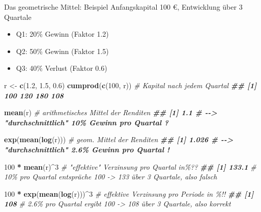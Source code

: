 \documentclass[
  10pt,
  ignorenonframetext,
]{beamer}
\newenvironment{Shaded}{\begin{snugshade}}{\end{snugshade}}
\newcommand{\CommentTok}[1]{\textcolor[rgb]{0.56,0.35,0.01}{\textit{#1}}}
\newcommand{\DecValTok}[1]{\textcolor[rgb]{0.00,0.00,0.81}{#1}}
\newcommand{\DocumentationTok}[1]{\textcolor[rgb]{0.56,0.35,0.01}{\textbf{\textit{#1}}}}
\newcommand{\FloatTok}[1]{\textcolor[rgb]{0.00,0.00,0.81}{#1}}
\newcommand{\FunctionTok}[1]{\textcolor[rgb]{0.13,0.29,0.53}{\textbf{#1}}}
\newcommand{\NormalTok}[1]{#1}
\newcommand{\OtherTok}[1]{\textcolor[rgb]{0.56,0.35,0.01}{#1}}
\newcommand{\SpecialCharTok}[1]{\textcolor[rgb]{0.81,0.36,0.00}{\textbf{#1}}}
\providecommand{\tightlist}{%
  \setlength{\itemsep}{0pt}\setlength{\parskip}{0pt}}
\begin{document}
\begin{frame}[fragile]{Das geometrische Mittel: Beispiel}
\protect\hypertarget{das-geometrische-mittel-beispiel}{}
Anfangskapital 100 €, Entwicklung über 3 Quartale

\begin{itemize}
\tightlist
\item
  Q1: 20\% Gewinn (Faktor 1.2)
\item
  Q2: 50\% Gewinn (Faktor 1.5)
\item
  Q3: 40\% Verlust (Faktor 0.6)\\
\end{itemize}

\scriptsize

\begin{Shaded}
\begin{Highlighting}[]
\NormalTok{r }\OtherTok{\textless{}{-}} \FunctionTok{c}\NormalTok{(}\FloatTok{1.2}\NormalTok{, }\FloatTok{1.5}\NormalTok{, }\FloatTok{0.6}\NormalTok{)}
\FunctionTok{cumprod}\NormalTok{(}\FunctionTok{c}\NormalTok{(}\DecValTok{100}\NormalTok{, r)) }\CommentTok{\# Kapital nach jedem Quartal}
\DocumentationTok{\#\# [1] 100 120 180 108}

\FunctionTok{mean}\NormalTok{(r) }\CommentTok{\# arithmetisches Mittel der Renditen}
\DocumentationTok{\#\# [1] 1.1 \# {-}{-}\textgreater{} "durchschnittlich" 10\% Gewinn pro Quartal ?}

\FunctionTok{exp}\NormalTok{(}\FunctionTok{mean}\NormalTok{(}\FunctionTok{log}\NormalTok{(r))) }\CommentTok{\# geom. Mittel der Renditen}
\DocumentationTok{\#\# [1] 1.026 \# {-}{-}\textgreater{} "durchschnittlich" 2.6\% Gewinn pro Quartal !}

\DecValTok{100} \SpecialCharTok{*} \FunctionTok{mean}\NormalTok{(r)}\SpecialCharTok{\^{}}\DecValTok{3} \CommentTok{\# "effektive" Verzinsung pro Quartal in\%??}
\DocumentationTok{\#\# [1] 133.1}
\CommentTok{\# 10\% pro Quartal entspräche 100 {-}\textgreater{} 133 über 3 Quartale, also falsch}

\DecValTok{100} \SpecialCharTok{*} \FunctionTok{exp}\NormalTok{(}\FunctionTok{mean}\NormalTok{(}\FunctionTok{log}\NormalTok{(r)))}\SpecialCharTok{\^{}}\DecValTok{3}  \CommentTok{\# effektive Verzinsung pro Periode in \%!! }
\DocumentationTok{\#\# [1] 108}
\CommentTok{\# 2.6\% pro Quartal ergibt 100 {-}\textgreater{} 108 über 3 Quartale, also korrekt}
\end{Highlighting}
\end{Shaded}
\end{frame}
\end{document}

